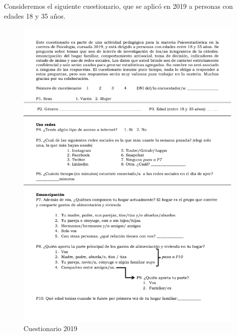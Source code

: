 \documentclass[]{book}
\begin{document}
Consideremos el siguiente cuestionario, que se aplicó en 2019 a personas con edades 18 y 35 años.

\begin{figure}

{\centering \includegraphics[width=11.47in]{imagenes/cuestionario2019_01} 

}

\caption{Cuestionario 2019}\label{fig:cuestionario}
\end{figure}
\end{document}
